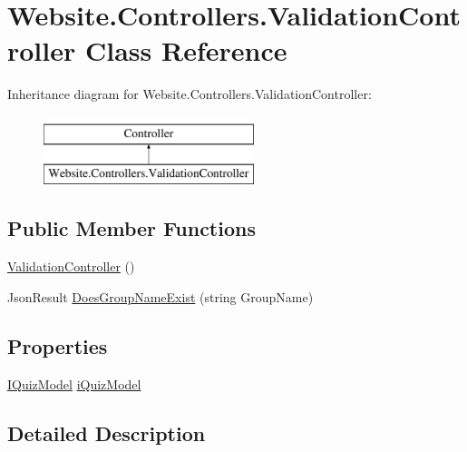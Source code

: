 \hypertarget{class_website_1_1_controllers_1_1_validation_controller}{}\section{Website.\+Controllers.\+Validation\+Controller Class Reference}
\label{class_website_1_1_controllers_1_1_validation_controller}
Inheritance diagram for Website.\+Controllers.\+Validation\+Controller\+:\begin{figure}[H]
\begin{center}
\leavevmode
\includegraphics[height=2.000000cm]{class_website_1_1_controllers_1_1_validation_controller}
\end{center}
\end{figure}
\subsection*{Public Member Functions}
\begin{DoxyCompactItemize}
\item 
\hyperlink{class_website_1_1_controllers_1_1_validation_controller_a0d0b00b50841b0d08ce3d100f8fc15bb}{Validation\+Controller} ()
\item 
Json\+Result \hyperlink{class_website_1_1_controllers_1_1_validation_controller_a009412db801d5d49a3df6053cbf3cf5d}{Does\+Group\+Name\+Exist} (string Group\+Name)
\end{DoxyCompactItemize}
\subsection*{Properties}
\begin{DoxyCompactItemize}
\item 
\hyperlink{interface_website_1_1_controllers_1_1_i_quiz_model}{I\+Quiz\+Model} \hyperlink{class_website_1_1_controllers_1_1_validation_controller_ae08cdf74da170febad8d02f9911b2f28}{i\+Quiz\+Model}
\end{DoxyCompactItemize}


\subsection{Detailed Description}


